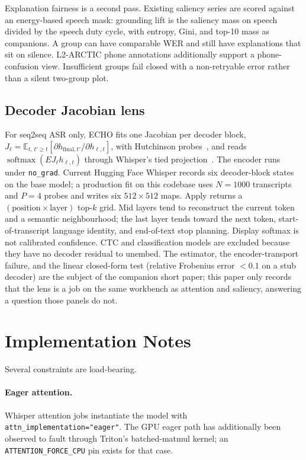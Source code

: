 \documentclass[conference]{IEEEtran}
\begin{document}
Explanation fairness is a second pass. Existing saliency series are scored against an energy-based speech mask: grounding lift is the saliency mass on speech divided by the speech duty cycle, with entropy, Gini, and top-10 mass as companions. A group can have comparable WER and still have explanations that sit on silence. L2-ARCTIC phone annotations additionally support a phone-confusion view. Insufficient groups fail closed with a non-retryable error rather than a silent two-group plot.

\subsection{Decoder Jacobian lens}

For seq2seq ASR only, ECHO fits one Jacobian per decoder block,
$J_\ell=\mathbb{E}_{t,\,t'\ge t}[\partial h_{\mathrm{final},t'}/\partial h_{\ell,t}]$,
with Hutchinson probes~\cite{hutchinson1989trace}, and reads $\operatorname{softmax}(E J_\ell h_{\ell,t})$ through Whisper's tied projection~\cite{gurnee2026workspace}. The encoder runs under \texttt{no\_grad}. Current Hugging Face Whisper records six decoder-block states on the base model; a production fit on this codebase uses $N=1000$ transcripts and $P=4$ probes and writes six $512\times 512$ maps. Apply returns a $(\text{position}\times\text{layer})$ top-$k$ grid. Mid layers tend to reconstruct the current token and a semantic neighbourhood; the last layer tends toward the next token, start-of-transcript language identity, and end-of-text stop planning. Display softmax is not calibrated confidence. CTC and classification models are excluded because they have no decoder residual to unembed. The estimator, the encoder-transport failure, and the linear closed-form test (relative Frobenius error $<0.1$ on a stub decoder) are the subject of the companion short paper; this paper only records that the lens is a job on the same workbench as attention and saliency, answering a question those panels do not.

\section{Implementation Notes}

Several constraints are load-bearing.

\paragraph{Eager attention.}
Whisper attention jobs instantiate the model with \texttt{attn\_implementation="eager"}. The GPU eager path has additionally been observed to fault through Triton's batched-matmul kernel; an \texttt{ATTENTION\_FORCE\_CPU} pin exists for that case.
\end{document}

